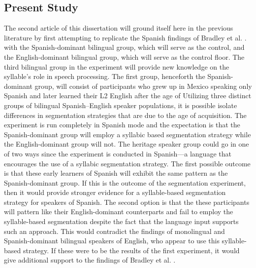 \subsection{Present Study}
The second article of this dissertation will ground itself here in the previous literature by first attempting to replicate the Spanish findings of Bradley et al. \parencite*{Bradley1993-qq}. with the Spanish-dominant bilingual group, which will serve as the control, and the English-dominant bilingual group, which will serve as the control floor. The third bilingual group in the experiment will provide new knowledge on the syllable’s role in speech processing.  The first group, henceforth the Spanish-dominant group, will consist of participants who grew up in Mexico speaking only Spanish and later learned their L2 English after the age of %
Utilizing three distinct groups of bilingual Spanish--English speaker populations, it is possible isolate differences in segmentation strategies that are due to the age of acquisition. The experiment is run completely in Spanish mode and the expectation is that the Spanish-dominant group will employ a syllabic based segmentation strategy while the English-dominant group will not. The heritage speaker group could go in one of two ways since the experiment is conducted in Spanish---a language that encourages the use of a syllabic segmentation strategy. The first possible outcome is that these early learners of Spanish will exhibit the same pattern as the Spanish-dominant group. If this is the outcome of the segmentation experiment, then it would provide stronger evidence for a syllable-based segmentation strategy for speakers of Spanish. The second option is that the these participants will pattern like their English-dominant counterparts and fail to employ the syllable-based segmentation despite the fact that the language input supports such an approach. This would contradict the findings of monolingual and Spanish-dominant bilingual speakers of English, who appear to use this syllable-based strategy. If these were to be the results of the first experiment, it would give additional support to the findings of Bradley et al. \parencite{Bradley1993-qq}. 
